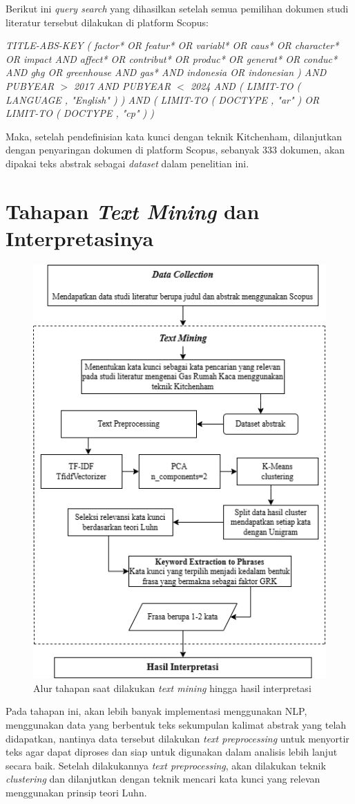 Berikut ini \textit{query search} yang dihasilkan setelah semua pemilihan dokumen studi literatur tersebut dilakukan di platform Scopus:

\begin{center}
    \textit{TITLE-ABS-KEY ( factor* OR featur* OR variabl* OR caus* OR character* OR impact AND affect* OR contribut* OR produc* OR generat* OR conduc* AND ghg OR greenhouse AND gas* AND indonesia OR indonesian ) AND PUBYEAR $>$ 2017 AND PUBYEAR $<$ 2024 AND ( LIMIT-TO ( LANGUAGE , "English" ) ) AND ( LIMIT-TO ( DOCTYPE , "ar" ) OR LIMIT-TO ( DOCTYPE , "cp" ) )}
\end{center}

Maka, setelah pendefinisian kata kunci dengan teknik Kitchenham, dilanjutkan dengan penyaringan dokumen di platform Scopus, sebanyak 333 dokumen, akan dipakai teks abstrak sebagai \textit{dataset} dalam penelitian ini.

\section{Tahapan \textit{Text Mining} dan Interpretasinya}
\begin{figure}[H]
    \centering
    \includegraphics[width=0.7\linewidth]{img/bab3-31.png}
    \caption{Alur tahapan saat dilakukan \textit{text mining} hingga hasil interpretasi}
    \label{fig:3-3}
\end{figure}
Pada tahapan ini, akan lebih banyak implementasi menggunakan NLP, menggunakan data yang berbentuk teks sekumpulan kalimat abstrak yang telah didapatkan, nantinya data tersebut dilakukan \textit{text preprocessing} untuk menyortir teks agar dapat diproses dan siap untuk digunakan dalam analisis lebih lanjut secara baik. Setelah dilakukannya \textit{text preprocessing}, akan dilakukan teknik \textit{clustering} dan dilanjutkan dengan teknik mencari kata kunci yang relevan menggunakan prinsip teori Luhn.

